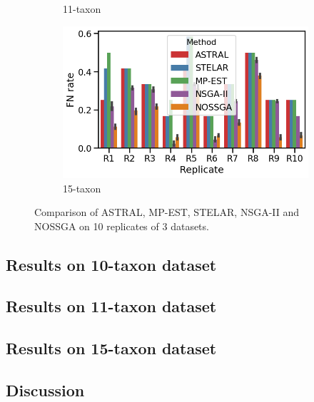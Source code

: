 \begin{figure}[!htbp]
\begin{adjustwidth}{-4.5cm}{}
\begin{subfigure}[b]{0.5\textwidth}
		\caption{11-taxon}
	\end{subfigure}%
	\begin{subfigure}[b]{0.5\textwidth}
		\includegraphics[width=\textwidth]{Figure/15-taxon_10_replicates}
		\caption{15-taxon}
	\end{subfigure}%
	\end{adjustwidth}
	\caption{Comparison of ASTRAL, MP-EST, STELAR, NSGA-II and NOSSGA on 10 replicates of 3 datasets.}
	\label{fig:datasets}

\end{figure}
\subsection{Results on 10-taxon dataset}
\subsection{Results on 11-taxon dataset}
\subsection{Results on 15-taxon dataset}
\subsection{Discussion}
